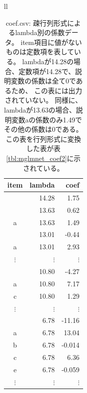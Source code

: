 \begin{table}[htbp]
\begin{center}
\begin{tabular}{ll}

\begin{minipage}{0.5\hsize}
\begin{center}
\caption{coef.csv: 疎行列形式によるlambda別の係数データ。
item項目に値がないものは定数項を表している。
lambdaが14.28の場合、定数項が14.28で、説明変数の係数は全て0であるため、
この表には出力されていない。
同様に、lambdaが13.63の場合、説明変数aの係数のみ1.49でその他の係数は0である。
この表を行列形式に変換した表が表\ref{tbl:mglmnet_coef2}に示されている。
\label{tbl:mglmnet_coef_csv}}
{\small
\begin{tabular}{crr}
\hline
item&lambda&coef \\
\hline
    &14.28 & 1.75 \\
    &13.63 & 0.62 \\
a   &13.63 & 1.49 \\
    &13.01 &-0.44 \\
a   &13.01 & 2.93 \\
$\vdots$ & $\vdots$ & $\vdots$ \\
    &10.80 &-4.27 \\
a   &10.80 & 7.17 \\
c   &10.80 & 1.29 \\
$\vdots$ & $\vdots$ & $\vdots$ \\
    & 6.78 &-11.16 \\
a   & 6.78 &13.04 \\
b   & 6.78 &-0.014 \\
c   & 6.78 & 6.36 \\
e   & 6.78 &-0.059 \\
$\vdots$ & $\vdots$ & $\vdots$ \\
\hline
\end{tabular} 
}
\end{center}
\end{minipage}


\end{tabular}
\end{center}
\end{table}
